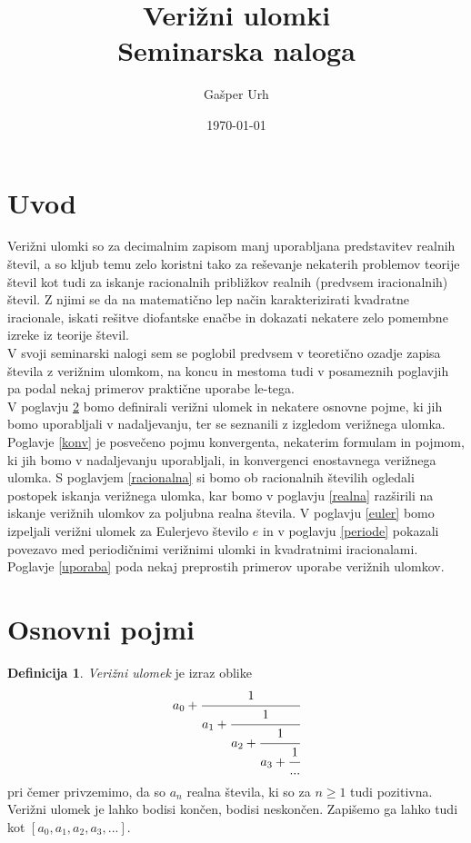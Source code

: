 \documentclass[a4paper,12pt]{article}
\title{\textbf{\huge{Verižni ulomki}\\\normalsize{Seminarska naloga}}}
\author{Gašper Urh}
\date{\today}
\theoremstyle{definition}
\newtheorem{df}{Definicija}[section]
\theoremstyle{proposition}
\theoremstyle{theorem}
\theoremstyle{lemma}
\begin{document}
\maketitle

\tableofcontents

\section{Uvod}

Verižni ulomki so za decimalnim zapisom manj uporabljana predstavitev realnih števil, a so kljub temu zelo koristni tako za reševanje nekaterih problemov teorije števil kot tudi za iskanje racionalnih približkov realnih (predvsem iracionalnih) števil. Z njimi se da na matematično lep način karakterizirati kvadratne iracionale, iskati rešitve diofantske enačbe in dokazati nekatere zelo pomembne izreke iz teorije števil. \\
V svoji seminarski nalogi sem se poglobil predvsem v teoretično ozadje zapisa števila z verižnim ulomkom, na koncu in mestoma tudi v posameznih poglavjih pa podal nekaj primerov praktične uporabe le-tega.\\
V poglavju \ref{ospojmi} bomo definirali verižni ulomek in nekatere osnovne pojme, ki jih bomo uporabljali v nadaljevanju, ter se seznanili z izgledom verižnega ulomka. Poglavje \ref{konv} je posvečeno pojmu konvergenta, nekaterim formulam in pojmom, ki jih bomo v nadaljevanju uporabljali, in konvergenci enostavnega verižnega ulomka. S poglavjem \ref{racionalna} si bomo ob racionalnih številih ogledali postopek iskanja verižnega ulomka, kar bomo v poglavju \ref{realna} razširili na iskanje verižnih ulomkov za poljubna realna števila. V poglavju \ref{euler} bomo izpeljali verižni ulomek za Eulerjevo število $e$ in v poglavju \ref{periode} pokazali povezavo med periodičnimi verižnimi ulomki in kvadratnimi iracionalami. Poglavje \ref{uporaba} poda nekaj preprostih primerov uporabe verižnih ulomkov.

\section{Osnovni pojmi} \label{ospojmi}

\begin{df}
	\textit{Verižni ulomek} je izraz oblike
	\[ a_0 + \cfrac{1}{a_1 + \cfrac{1}{a_2 + \cfrac{1}{a_3 + \cfrac{1}{...}}}} \]
	pri čemer privzemimo, da so $a_n$ realna števila, ki so za $n \geq 1$ tudi pozitivna. Verižni ulomek je lahko bodisi končen, bodisi neskončen.
	\newline
	\newline
	Zapišemo ga lahko tudi kot $[a_0, a_1, a_2, a_3, ...]$.
\end{df}
	
\end{document}
